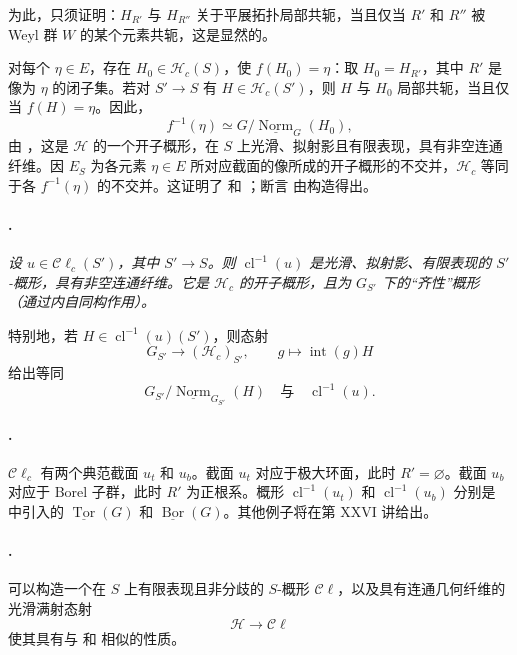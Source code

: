 为此，只须证明：\(H_{R'}\) 与 \(H_{R''}\) 关于平展拓扑局部共轭，当且仅当 \(R'\) 和 \(R''\) 被 Weyl 群 \(W\) 的某个元素共轭，这是显然的。

对每个 \(\eta\in E\)，存在 \(H_0\in\mathcal H_c(S)\)，使 \(f(H_0)=\eta\)：取 \(H_0=H_{R'}\)，其中 \(R'\) 是像为 \(\eta\) 的闭子集。若对 \(S'\to S\) 有 \(H\in\mathcal H_c(S')\)，则 \(H\) 与 \(H_0\) 局部共轭，当且仅当 \(f(H)=\eta\)。因此，
\[
  f^{-1}(\eta)\simeq
  G\big/\underline{\operatorname{Norm}}_G(H_0),
\]
由 ，这是 \(\mathcal H\) 的一个开子概形，在 \(S\) 上光滑、拟射影且有限表现，具有非空连通纤维。因 \(E_S\) 为各元素 \(\eta\in E\) 所对应截面的像所成的开子概形的不交并，\(\mathcal H_c\) 等同于各 \(f^{-1}(\eta)\) 的不交并。这证明了 \textup{} 和 \textup{}；断言 \textup{} 由构造得出。

\paragraph{.}
{\itshape 设 \(u\in\mathcal C\ell_c(S')\)，其中 \(S'\to S\)。则 \(\operatorname{cl}^{-1}(u)\) 是光滑、拟射影、有限表现的 \(S'\)-概形，具有非空连通纤维。它是 \(\mathcal H_c\) 的开子概形，且为 \(G_{S'}\) 下的“齐性”概形 \textup{（通过内自同构作用）}。

特别地，若 \(H\in\operatorname{cl}^{-1}(u)(S')\)，则态射
\[
  G_{S'}\longrightarrow(\mathcal H_c)_{S'},\qquad
  g\longmapsto\operatorname{int}(g)H
\]
给出等同
\[
  G_{S'}\big/
  \underline{\operatorname{Norm}}_{G_{S'}}(H)
  \quad\text{与}\quad
  \operatorname{cl}^{-1}(u).
\]}

\paragraph{.}
\(\mathcal C\ell_c\) 有两个典范截面 \(u_t\) 和 \(u_b\)。截面 \(u_t\) 对应于极大环面，此时 \(R'=\varnothing\)。截面 \(u_b\) 对应于 Borel 子群，此时 \(R'\) 为正根系。概形 \(\operatorname{cl}^{-1}(u_t)\) 和 \(\operatorname{cl}^{-1}(u_b)\) 分别是  中引入的 \(\underline{\operatorname{Tor}}(G)\) 和 \(\underline{\operatorname{Bor}}(G)\)。其他例子将在第 XXVI 讲给出。

\paragraph{.}
可以构造一个在 \(S\) 上有限表现且非分歧的 \(S\)-概形 \(\mathcal C\ell\)，以及具有连通几何纤维的光滑满射态射
\[
  \mathcal H\longrightarrow\mathcal C\ell
\]
使其具有与 \textup{} 和 \textup{} 相似的性质。


